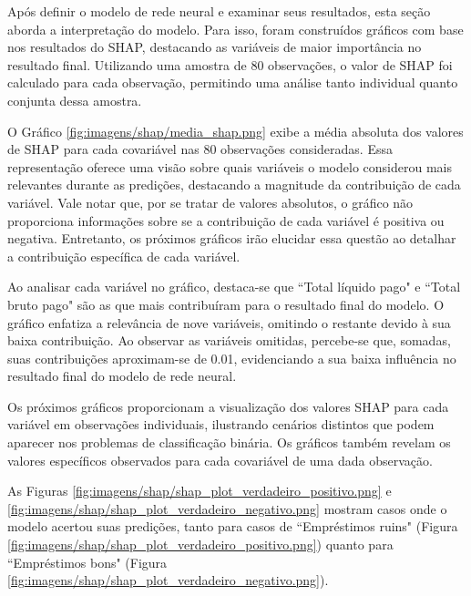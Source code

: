 Após definir o modelo de rede neural e examinar seus resultados, esta seção aborda a interpretação do modelo. 
Para isso, foram construídos gráficos com base nos resultados do SHAP, destacando as variáveis de maior importância
 no resultado final. Utilizando uma amostra de 80 observações, o valor de SHAP foi calculado para cada observação, 
 permitindo uma análise tanto individual quanto conjunta dessa amostra.



O Gráfico \ref{fig:imagens/shap/media_shap.png} exibe a média absoluta dos valores de SHAP para cada covariável nas
80 observações consideradas. Essa representação oferece uma visão sobre quais variáveis o modelo considerou mais
relevantes durante as predições, destacando a magnitude da contribuição de cada variável. Vale notar que, por 
se tratar de valores absolutos, o gráfico não proporciona informações sobre se a contribuição de cada variável
é positiva ou negativa. Entretanto, os próximos gráficos irão elucidar essa questão ao detalhar a contribuição 
específica de cada variável.

Ao analisar cada variável no gráfico, destaca-se que ``Total líquido pago" e ``Total bruto pago" são as que mais
contribuíram para o resultado final do modelo. O gráfico enfatiza a relevância de nove variáveis, omitindo 
o restante devido à sua baixa contribuição. Ao observar as variáveis omitidas, percebe-se que, somadas, 
suas contribuições aproximam-se de 0.01, evidenciando a sua baixa influência no resultado final do modelo de rede neural.

Os próximos gráficos proporcionam a visualização dos valores SHAP para cada variável em observações individuais, ilustrando
cenários distintos que podem aparecer nos problemas de classificação binária. Os gráficos também revelam os valores específicos
observados para cada covariável de uma dada observação.

As Figuras \ref{fig:imagens/shap/shap_plot_verdadeiro_positivo.png} e \ref{fig:imagens/shap/shap_plot_verdadeiro_negativo.png} 
mostram casos onde o modelo acertou suas predições, tanto para casos de ``Empréstimos ruins" (Figura \ref{fig:imagens/shap/shap_plot_verdadeiro_positivo.png})
quanto para ``Empréstimos bons" (Figura \ref{fig:imagens/shap/shap_plot_verdadeiro_negativo.png}).



